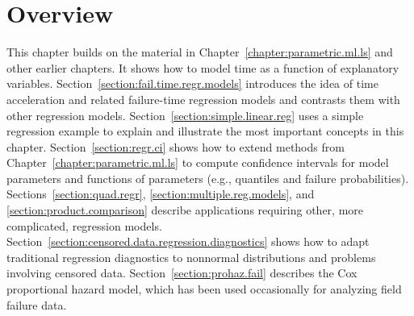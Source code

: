 \section*{Overview}
This chapter builds on the material in
Chapter~\ref{chapter:parametric.ml.ls} and other earlier chapters.
It shows how to model time as a function of explanatory variables.
Section~\ref{section:fail.time.regr.models}
introduces the idea of time acceleration and related failure-time
regression models and contrasts them with other regression models.
Section~\ref{section:simple.linear.reg} uses a simple regression
example to explain and illustrate the most important concepts in 
this chapter. Section~\ref{section:regr.ci}
shows how to extend methods from
Chapter~\ref{chapter:parametric.ml.ls} to compute confidence intervals
for model
parameters and functions of parameters (e.g., quantiles and failure
probabilities).  Sections~\ref{section:quad.regr},
\ref{section:multiple.reg.models}, and
\ref{section:product.comparison} describe applications requiring 
other, more complicated, regression models.
Section~\ref{section:censored.data.regression.diagnostics} shows how
to adapt traditional regression diagnostics to nonnormal
distributions
and problems involving
censored data.  Section~\ref{section:prohaz.fail} describes the Cox
proportional hazard model, which has been used occasionally for
analyzing field failure data.


